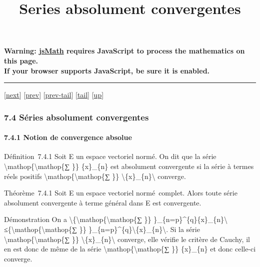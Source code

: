 \documentclass[]{article}
\title{Series absolument convergentes}
\author{}
\date{}
\begin{document}
\maketitle

\textbf{Warning: \href{http://www.math.union.edu/locate/jsMath}{jsMath}
requires JavaScript to process the mathematics on this page.\\ If your
browser supports JavaScript, be sure it is enabled.}

\begin{center}\rule{3in}{0.4pt}\end{center}

{[}\href{coursse39.html}{next}{]} {[}\href{coursse37.html}{prev}{]}
{[}\href{coursse37.html\#tailcoursse37.html}{prev-tail}{]}
{[}\hyperref[tailcoursse38.html]{tail}{]}
{[}\href{coursch8.html\#coursse38.html}{up}{]}

\subsubsection{7.4 Séries absolument convergentes}

\paragraph{7.4.1 Notion de convergence absolue}

Définition~7.4.1 Soit E un espace vectoriel normé. On dit que la série
\textbackslash{}mathop\{\textbackslash{}mathop\{∑ \}\} \{x\}\_\{n\} est
absolument convergente si la série à termes réels positifs
\textbackslash{}mathop\{\textbackslash{}mathop\{∑ \}\}
\textbackslash{}\textbar{}\{x\}\_\{n\}\textbackslash{}\textbar{}
converge.

Théorème~7.4.1 Soit E un espace vectoriel normé~complet. Alors toute
série absolument convergente à terme général dans E est convergente.

Démonstration On a
\textbackslash{}\textbar{}\{\textbackslash{}mathop\{\textbackslash{}mathop\{∑
\}\} \}\_\{n=p\}\^{}\{q\}\{x\}\_\{n\}\textbackslash{}\textbar{}
≤\{\textbackslash{}mathop\{\textbackslash{}mathop\{∑ \}\}
\}\_\{n=p\}\^{}\{q\}\textbackslash{}\textbar{}\{x\}\_\{n\}\textbackslash{}\textbar{}.
Si la série \textbackslash{}mathop\{\textbackslash{}mathop\{∑ \}\}
\textbackslash{}\textbar{}\{x\}\_\{n\}\textbackslash{}\textbar{}
converge, elle vérifie le critère de Cauchy, il en est donc de même de
la série \textbackslash{}mathop\{\textbackslash{}mathop\{∑ \}\}
\{x\}\_\{n\} et donc celle-ci converge.
\end{document}
